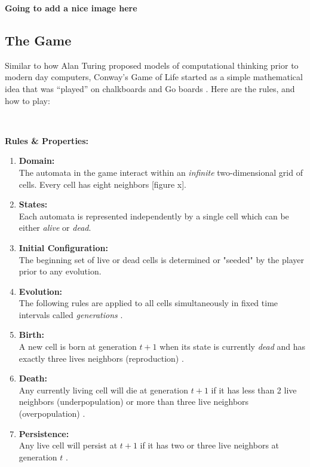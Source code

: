 \documentclass{article}
\theoremstyle{definition}
\theoremstyle{plain}
\theoremstyle{plain}
\begin{document}
\textbf{Going to add a nice image here}

\subsection{The Game}
Similar to how Alan Turing proposed models of computational thinking prior to modern day computers, Conway's Game of Life started as a simple mathematical idea that was “played” on chalkboards and Go boards \cite{Izhikevich_Conway_Seth}. Here are the rules, and how to play: 

\

\textbf{Rules \& Properties: }
\begin{enumerate}

  \item \textbf{Domain: }\\ The automata in the game interact within an \textit{infinite} two-dimensional grid of cells. Every cell has eight neighbors \cite{Izhikevich_Conway_Seth}[figure x]. \label{rule_one}

  \item \textbf{States: }\\ Each automata is represented independently by a single cell which can be either \textit{alive} or \textit{dead}.

  \item \textbf{Initial Configuration: } \\ The beginning set of live or dead cells is determined or "seeded" by the player prior to any evolution.

  \item \textbf{Evolution: } \\ The following rules are applied to all cells simultaneously in fixed time intervals called \textit{generations} \cite{Bontes2019}.

  \item \textbf{Birth: } \\ A new cell is born at generation $t + 1$ when its state is currently \textit{dead} and has exactly three lives neighbors (reproduction) \cite{Bontes2019}.

  \item \textbf{Death: } \\ Any currently living cell will die at generation $t + 1$ if it has less than 2 live neighbors (underpopulation) or more than three live neighbors (overpopulation) \cite{Bontes2019}.

  \item \textbf{Persistence: } \\ Any live cell will persist at $t + 1$ if it has two or three live neighbors at generation $t$ \cite{Izhikevich_Conway_Seth}.
\end{enumerate}
\end{document}
